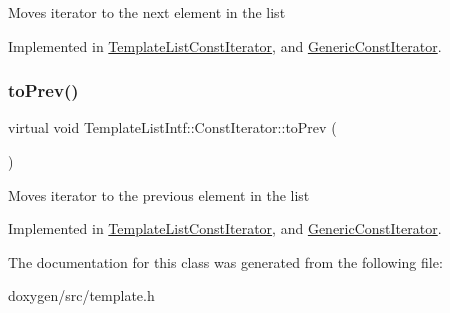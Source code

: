 Moves iterator to the next element in the list 

Implemented in \mbox{\hyperlink{class_template_list_const_iterator_ab7681f11844471c2522984d3e2101d24}{Template\+List\+Const\+Iterator}}, and \mbox{\hyperlink{class_generic_const_iterator_a2ac3dc44a25c4790bd2a816b240f6a24}{Generic\+Const\+Iterator}}.

\mbox{\label{class_template_list_intf_1_1_const_iterator_a9e5ce362eb61eb772df5afefa5703510}} 
\subsubsection{\texorpdfstring{toPrev()}{toPrev()}}
{\footnotesize\ttfamily virtual void Template\+List\+Intf\+::\+Const\+Iterator\+::to\+Prev (\begin{DoxyParamCaption}{ }\end{DoxyParamCaption})\hspace{0.3cm}{\ttfamily [pure virtual]}}

Moves iterator to the previous element in the list 

Implemented in \mbox{\hyperlink{class_template_list_const_iterator_a80276f5474320de67b93f287cdd6cd79}{Template\+List\+Const\+Iterator}}, and \mbox{\hyperlink{class_generic_const_iterator_aeafefa5d7969558a52c32817fd8e7457}{Generic\+Const\+Iterator}}.



The documentation for this class was generated from the following file\+:\begin{DoxyCompactItemize}
\item 
doxygen/src/template.\+h\end{DoxyCompactItemize}
